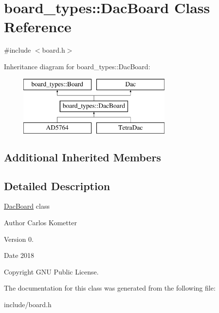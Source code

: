 \hypertarget{classboard__types_1_1DacBoard}{}\section{board\+\_\+types\+:\+:Dac\+Board Class Reference}
\label{classboard__types_1_1DacBoard}


{\ttfamily \#include $<$board.\+h$>$}

Inheritance diagram for board\+\_\+types\+:\+:Dac\+Board\+:\begin{figure}[H]
\begin{center}
\leavevmode
\includegraphics[height=3.000000cm]{classboard__types_1_1DacBoard}
\end{center}
\end{figure}
\subsection*{Additional Inherited Members}


\subsection{Detailed Description}
\mbox{\hyperlink{classboard__types_1_1DacBoard}{Dac\+Board}} class \begin{DoxyAuthor}{Author}
Carlos Kometter 
\end{DoxyAuthor}
\begin{DoxyVersion}{Version}
0. 
\end{DoxyVersion}
\begin{DoxyDate}{Date}
2018 
\end{DoxyDate}
\begin{DoxyCopyright}{Copyright}
G\+NU Public License. 
\end{DoxyCopyright}


The documentation for this class was generated from the following file\+:\begin{DoxyCompactItemize}
\item 
include/board.\+h\end{DoxyCompactItemize}

